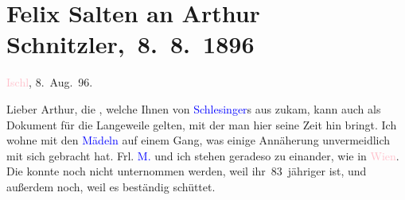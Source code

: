 

\renewcommand{\erwaehntePersonen}{Personen: Richard Beer-Hofmann, Paula Beer-Hofmann, Else Berger, Paul Goldmann, Moriz Metzl, Friedrich Mitterwurzer, Wilhelmine Mitterwurzer, Ottilie Salten, Franziska Schlesinger, Emil Schlesinger, Margherita Schlesinger}
\renewcommand{\erwaehnteOrte}{Orte: Bad Aussee, Bad Ischl, Kopenhagen, Skodsborg, Wien}
\renewcommand{\erwaehnteWerke}{Werke: Anatol, Das Märchen. Schauspiel in drei Aufzügen, Ein Engagement, Herodes und Mariamne. Eine Tragödie in fünf Aufzügen, Judith. Eine Tragödie in fünf Aufzügen}
\section[ Felix Salten an Arthur Schnitzler, 8. 8. 1896]{Felix Salten an Arthur Schnitzler, 8. 8. 1896}
\nopagebreak{}
\rehead{ }\normalsize\beginnumbering{}
\toendnotes[C]{\smallbreak\pagebreak[2]}
\toendnotes[C]{\smallbreak}
\pstart
           \raggedleft{}{\pb}\textcolor{pink}{Ischl}{}\ledrightnote{\textcolor{pink}{Bad Ischl}}, 8. Aug. 96.\pend
           
\pstart
           Lieber Arthur, die \label{K_L03178-1v}\label{K_L03178-1h}, welche Ihnen von \textcolor{blue}{Schlesinger}{}\ledrightnote{\textcolor{blue}{Franziska Schlesinger}{\newline}\textcolor{blue}{Emil Schlesinger}}s aus zukam, kann auch als Dokument für die Langeweile gelten,
               mit der man hier seine Zeit hin bringt. Ich wohne mit den \textcolor{blue}{Mädeln}{}\ledrightnote{{$\rightarrow$}\textcolor{blue}{Else Berger}{\newline}{$\rightarrow$}\textcolor{blue}{Margherita Schlesinger}} auf einem
               Gang, was einige Annäherung unvermeidlich mit sich gebracht hat. Frl. \textcolor{blue}{M.}{}\ledrightnote{\textcolor{blue}{Ottilie Salten}} und ich stehen geradeso zu einander, wie in
                  \textcolor{pink}{Wien}{}\ledrightnote{\textcolor{pink}{Wien}}. Die \label{K_L03178-2v}\label{K_L03178-2h} konnte noch nicht unternommen werden, weil ihr 83 jähriger \label{K_L03178-3v}\label{K_L03178-3h} ist, und außerdem noch,
               weil es beständig schüttet.\pend
           
